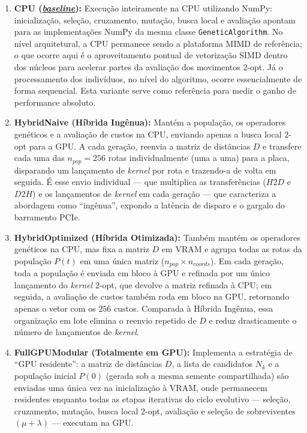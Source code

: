 \begin{enumerate}
      \item
            \textbf{CPU (\hyperlink{term:baseline}{\emph{baseline}}):} Execução inteiramente na CPU utilizando NumPy: inicialização, seleção, cruzamento, mutação, busca local e avaliação apontam para as implementações NumPy da mesma classe \texttt{GeneticAlgorithm}.
            No nível arquitetural, a CPU permanece sendo a plataforma MIMD de referência; o que ocorre aqui é o aproveitamento pontual de vetorização SIMD dentro dos núcleos para acelerar partes da avaliação dos movimentos \(2\)-opt.
            Já o processamento dos indivíduos, no nível do algoritmo, ocorre essencialmente de forma sequencial.
            Esta variante serve como referência para medir o ganho de performance absoluto.
      \item
            \textbf{HybridNaive (Híbrida Ingênua):} Mantém a população, os operadores genéticos e a avaliação de custos na CPU, enviando apenas a busca local \(2\)-opt para a GPU.
            A cada geração, reenvia a matriz de distâncias \(D\) e transfere cada uma das \(n_{pop} = 256\) rotas individualmente (uma a uma) para a placa, disparando um lançamento de \emph{kernel} por rota e trazendo-a de volta em seguida.
            É esse envio individual --- que multiplica as transferências (\(\mathit{H2D}\) e \(\mathit{D2H}\)) e os lançamentos de \emph{kernel} em cada geração --- que caracteriza a abordagem como ``ingênua'', expondo a latência de disparo e o gargalo do barramento PCIe.
      \item
            \textbf{HybridOptimized (Híbrida Otimizada):} Também mantém os operadores genéticos na CPU, mas fixa a matriz \(D\) em VRAM e agrupa todas as rotas da população \(P(t)\) em uma única matriz (\(n_{pop} \times n_{coords}\)).
            Em cada geração, toda a população é enviada em bloco à GPU e refinada por um único lançamento do \emph{kernel} \(2\)-opt, que devolve a matriz refinada à CPU; em seguida, a avaliação de custos também roda em bloco na GPU, retornando apenas o vetor com os \(256\) custos.
            Comparada à Híbrida Ingênua, essa organização em lote elimina o reenvio repetido de \(D\) e reduz drasticamente o número de lançamentos de \emph{kernel}.
      \item
            \textbf{FullGPUModular (Totalmente em GPU):} Implementa a estratégia de ``GPU residente'': a matriz de distâncias \(D\), a lista de candidatos \(N_k\) e a população inicial \(P(0)\) (gerada sob a mesma semente compartilhada) são enviadas uma única vez na inicialização à VRAM, onde permanecem residentes enquanto todas as etapas iterativas do ciclo evolutivo --- seleção, cruzamento, mutação, busca local \(2\)-opt, avaliação e seleção de sobreviventes \((\mu + \lambda)\) --- executam na GPU.

\end{enumerate}
